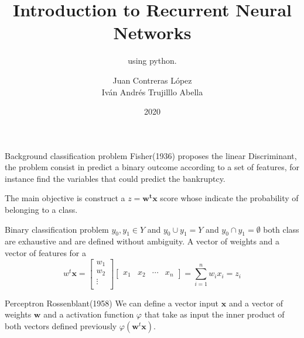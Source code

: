 \documentclass{beamer}
\institute{Javeriana}
\date{2020}
\title[Pontificia Universidad Javeriana] %
{Introduction to Recurrent Neural Networks}
\subtitle{ using python.}
\author[
Juan Contreras López \\
Iván Andrés Trujillo

] 
{
Juan Contreras López \\
Iván Andrés Trujilllo Abella}
\institute[] 
{
  Facultad de Ingenieria\\
  Pontificia Universidad Javeriana
  \and
  
\textbf{}
}
\date[MINTA] %
\begin{document}
\frame{\titlepage}



\begin{frame}[fragile]{Background classification problem}
Fisher(1936) proposes the linear Discriminant, 
the problem consist in predict a binary outcome according to a set of features, for instance find the variables that could predict the bankruptcy.

The main objective is construct a $z = \mathbf{w^{t}x}$ 
score whose indicate the probability of belonging to a class.
\end{frame}


\begin{frame}{Binary classification problem}
$y_{0},y_{1} \in Y $ and $y_{0} \cup y_{1} = Y$ and $y_{0} \cap y_{1} = \emptyset$ both class are exhaustive and are defined without ambiguity. 
A vector of weights and a vector of features for a 
\[
w^{t} \mathbf{x} = 
\begin{bmatrix}
w_{1} \\
w_{2} \\
\vdots \\
\end{bmatrix}
\begin{bmatrix}
x_{1} & x_{2} & \cdots & x_{n}
\end{bmatrix}
= \sum_{i=1}^{n}w_{i}x_{i} = z_{i}
\]

\end{frame}

\begin{frame}[fragile]{Perceptron}
Rossenblant(1958)
We can define a vector input $\mathbf{x}$ and a vector of weights $\mathbf{w}$ and a activation function $\varphi$ that take as input the inner product of both vectors defined previously $\varphi(\mathbf{w}^{t}\mathbf{x})$.

\end{frame}
\end{document}
